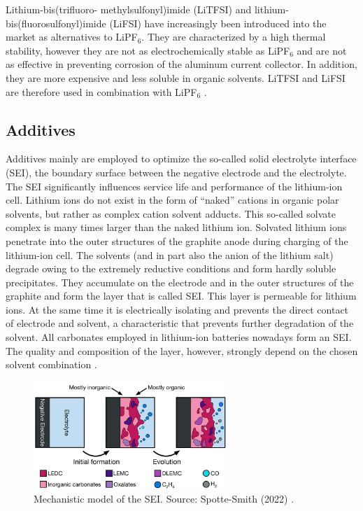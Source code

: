 Lithium-bis(trifluoro- methylsulfonyl)imide (LiTFSI) and lithium-bis(fluorosulfonyl)imide (LiFSI) have increasingly been introduced into the market as alternatives to LiPF$_6$. They are characterized by a high thermal stability, however they are not as electrochemically stable as LiPF$_6$ and are not as effective in preventing corrosion of the aluminum current collector. In addition, they are more expensive and less soluble in organic solvents. LiTFSI and LiFSI are therefore used in combination with LiPF$_6$ \cite{xu2004nonaqueous}.

\subsection{Additives}
\label{sec:additives}
Additives mainly are employed to optimize the so-called solid electrolyte interface (SEI), the boundary surface between the negative electrode and the electrolyte. The SEI significantly influences service life and performance of the lithium-ion cell.
Lithium ions do not exist in the form of “naked” cations in organic polar solvents, but rather as complex cation solvent adducts. This so-called solvate complex is many times larger than the naked lithium ion.
Solvated lithium ions penetrate into the outer structures of the graphite anode during charging of the lithium-ion cell. The solvents (and in part also the anion of the lithium salt) degrade owing to the extremely reductive conditions and form hardly soluble precipitates. They accumulate on the electrode and in the outer structures of the graphite and form the layer that is called SEI.
This layer is permeable for lithium ions. At the same time it is electrically isolating and prevents the direct contact of electrode and solvent, a characteristic that prevents further degradation of the solvent. All carbonates employed in lithium-ion batteries nowadays form an SEI. The quality and composition of the layer, however, strongly depend on the chosen solvent combination \cite{korthauer2018lithium}.

\begin{figure}[ht]
    \centering
    \includegraphics[width=0.65\textwidth]{Images/Chapter1/sei.jpeg}
    \caption[Mechanistic model of the SEI]{Mechanistic model of the SEI. Source: Spotte-Smith (2022) \cite{spotte2022toward}.}
    \label{fig:sei}
\end{figure}

